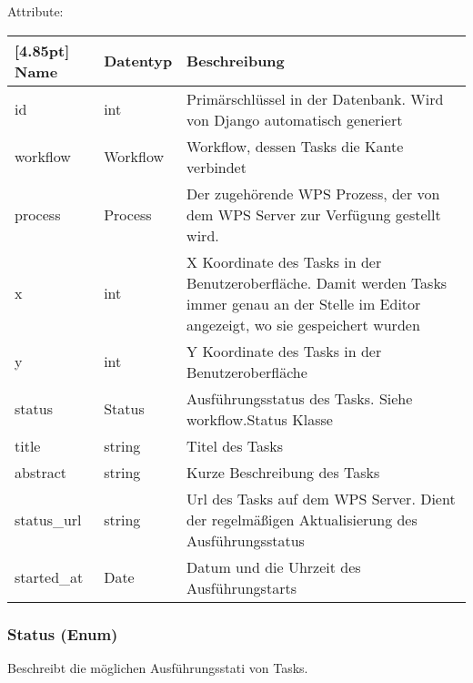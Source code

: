 			Attribute:
			\begin{center}
				\setlength\tabcolsep{5pt}
				\renewcommand{\arraystretch}{1.5}
				
				\begin{tabularx}{\textwidth}{|l|l|X|}
					\hline
					\rowcolor[gray]{0.75}[4.85pt]
					Name & Datentyp & Beschreibung \\ \hline 
			   		id & int & Primärschlüssel in der Datenbank. Wird von Django automatisch generiert \\ \hline
			   		workflow & Workflow & Workflow, dessen Tasks die Kante verbindet \\ \hline
			   		process & Process & Der zugehörende WPS Prozess, der von dem WPS Server zur Verfügung gestellt wird. \\\hline
			   		x & int & X Koordinate des Tasks in der Benutzeroberfläche. Damit werden Tasks immer genau an der Stelle im Editor angezeigt, wo sie gespeichert wurden\\ \hline
			   		y & int & Y Koordinate des Tasks in der Benutzeroberfläche\\ \hline
			   		status & Status & Ausführungsstatus des Tasks. Siehe workflow.Status Klasse \\ \hline
			   		title & string & Titel des Tasks \\ \hline
			   		abstract & string & Kurze Beschreibung des Tasks \\ \hline
			   		status\_url & string & Url des Tasks auf dem WPS Server. Dient der  regelmäßigen Aktualisierung des Ausführungsstatus \\ \hline
			   		started\_at & Date & Datum und die Uhrzeit des Ausführungstarts \\ \hline
				\end{tabularx}
			\end{center}			

\newpage

		\subsubsection{Status (Enum)}	
			Beschreibt die möglichen Ausführungsstati von Tasks. \newline
			
